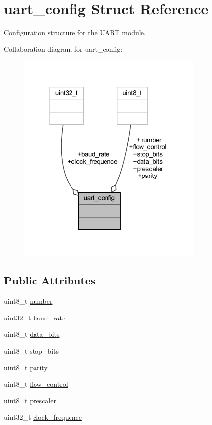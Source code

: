 \hypertarget{structuart__config}{}\section{uart\+\_\+config Struct Reference}
\label{structuart__config}


Configuration structure for the U\+A\+RT module.  




Collaboration diagram for uart\+\_\+config\+:\nopagebreak
\begin{figure}[H]
\begin{center}
\leavevmode
\includegraphics[width=259pt]{structuart__config__coll__graph}
\end{center}
\end{figure}
\subsection*{Public Attributes}
\begin{DoxyCompactItemize}
\item 
uint8\+\_\+t \hyperlink{structuart__config_a9f1c46bb7135a0a5dc0bce4f9982dc5f}{number}
\item 
uint32\+\_\+t \hyperlink{structuart__config_a3002fe5cb1c359f93dddb9198356bdcc}{baud\+\_\+rate}
\item 
uint8\+\_\+t \hyperlink{structuart__config_a93ee24cf6669fb4cfece78a53d3ec6c5}{data\+\_\+bits}
\item 
uint8\+\_\+t \hyperlink{structuart__config_a7b98cd63c531110dc3dc99e94db73642}{stop\+\_\+bits}
\item 
uint8\+\_\+t \hyperlink{structuart__config_a9371728729252797880de052aae01089}{parity}
\item 
uint8\+\_\+t \hyperlink{structuart__config_a30a786254694bfca26d7985545b6ffc6}{flow\+\_\+control}
\item 
uint8\+\_\+t \hyperlink{structuart__config_a9fb83c1cf1226b2dc4371bb79699dd71}{prescaler}
\item 
uint32\+\_\+t \hyperlink{structuart__config_a07d92658a8aea18961c39878c11fa689}{clock\+\_\+frequence}
\end{DoxyCompactItemize}


